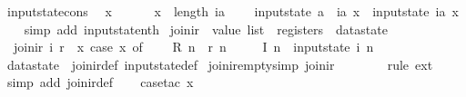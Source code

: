 \begin{isabellebody}
\isamarkupfalse%
%
\endisatagproof
{\isafoldproof}%
%
\isadelimproof
\isanewline
%
\endisadelimproof
\isanewline
{}\isamarkupfalse%
\ input{}state{\isacharunderscore}cons{\isacharcolon}\isanewline
\ \ {\isachardoublequoteopen}x{}\ {\isachargreater}\ {}\ {\isasymLongrightarrow}\isanewline
\ \ \ x{}\ {\isacharless}\ length\ ia\ {\isasymLongrightarrow}\isanewline
\ \ \ input{}state\ {\isacharparenleft}a\ {\isacharhash}\ ia{\isacharparenright}\ x{}\ {\isacharequal}\ input{}state\ ia\ {\isacharparenleft}x{}{\isacharminus}{}{\isacharparenright}{\isachardoublequoteclose}\isanewline
%
\isadelimproof
\ \ %
\endisadelimproof
%
\isatagproof
{}\isamarkupfalse%
\ {\isacharparenleft}simp\ add{\isacharcolon}\ input{}state{\isacharunderscore}nth{\isacharparenright}%
\endisatagproof
{\isafoldproof}%
%
\isadelimproof
\isanewline
%
\endisadelimproof
\isanewline
{}\isamarkupfalse%
\ join{\isacharunderscore}ir\ {\isacharcolon}{\isacharcolon}\ {\isachardoublequoteopen}value\ list\ {\isasymRightarrow}\ registers\ {\isasymRightarrow}\ datastate{\isachardoublequoteclose}\ \isanewline
\ \ {\isachardoublequoteopen}join{\isacharunderscore}ir\ i\ r\ {\isasymequiv}\ {\isacharparenleft}{\isasymlambda}x{\isachardot}\ case\ x\ of\isanewline
\ \ \ \ R\ n\ {\isasymRightarrow}\ r\ n\ {\isacharbar}\isanewline
\ \ \ \ I\ n\ {\isasymRightarrow}\ {\isacharparenleft}input{}state\ i{\isacharparenright}\ n\isanewline
\ \ {\isacharparenright}{\isachardoublequoteclose}\isanewline
\isanewline
{}\isamarkupfalse%
\ datastate\ {\isacharequal}\ join{\isacharunderscore}ir{\isacharunderscore}def\ input{}state{\isacharunderscore}def\isanewline
\isanewline
{}\isamarkupfalse%
\ join{\isacharunderscore}ir{\isacharunderscore}empty{\isacharbrackleft}simp{\isacharbrackright}{\isacharcolon}\ {\isachardoublequoteopen}join{\isacharunderscore}ir\ {\isacharbrackleft}{\isacharbrackright}\ {\isacharless}{\isachargreater}\ {\isacharequal}\ {\isacharless}{\isachargreater}{\isachardoublequoteclose}\isanewline
%
\isadelimproof
\ \ %
\endisadelimproof
%
\isatagproof
{}\isamarkupfalse%
\ {\isacharparenleft}rule\ ext{\isacharparenright}\isanewline
\ \ \isamarkupfalse%
\ {\isacharparenleft}simp\ add{\isacharcolon}\ join{\isacharunderscore}ir{\isacharunderscore}def{\isacharparenright}\isanewline
\ \ \isamarkupfalse%
\ {\isacharparenleft}case{\isacharunderscore}tac\ x{\isacharparenright}\isanewline

\end{isabellebody}
